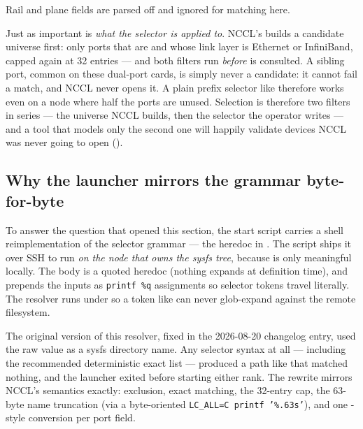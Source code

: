 Rail and plane fields are parsed off and ignored for matching here.

Just as important is \emph{what the selector is applied to}. NCCL's
 builds a candidate universe first: only ports that are
 and whose link layer is Ethernet or InfiniBand, capped again at
32 entries --- and both filters run \emph{before}  is
consulted. A  sibling port, common on these dual-port cards, is
simply never a candidate: it cannot fail a match, and NCCL never opens it. A
plain prefix selector like  therefore works even on a node where
half the ports are unused. Selection is therefore two filters in series ---
the universe NCCL builds, then the selector the operator writes --- and a
tool that models only the second one will happily validate devices NCCL was
never going to open ().

\subsection{Why the launcher mirrors the grammar byte-for-byte}

To answer the question that opened this section, the start script carries a
shell reimplementation of the selector grammar --- the
 heredoc in
. The script ships it over SSH
to run \emph{on the node that owns the sysfs tree}, because
 is only meaningful locally. The body is a
quoted heredoc (nothing expands at definition time), and
 prepends the inputs as \texttt{printf \%q}
assignments so selector tokens travel literally. The resolver runs under
 so a token like  can never glob-expand against the
remote filesystem.

The original version of this resolver, fixed in the 2026-08-20 changelog
entry, used the raw  value as a sysfs directory name.
Any selector syntax at all --- including the recommended deterministic exact
list  --- produced a path like
 that matched
nothing, and the launcher exited before starting either rank. The rewrite
mirrors NCCL's semantics exactly: \code{^} exclusion, \code{=} exact
matching, the 32-entry cap, the 63-byte name truncation (via a
byte-oriented \texttt{LC\_ALL=C printf '\%.63s'}), and one -style
conversion per port field.

